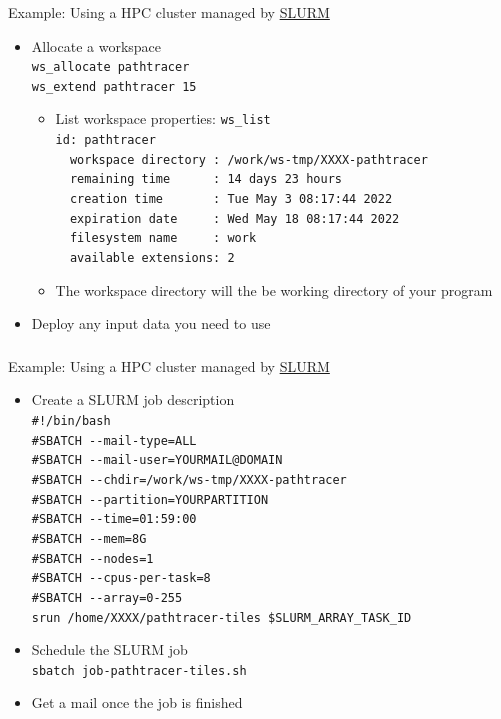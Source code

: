\documentclass[utf8,stillsansserifmath,fleqn,t]{beamer}
\newcommand{\code}[1]{\texttt{#1}}
\begin{document}
\begin{frame}
\frametitle{\insertsection}
Example: Using a HPC cluster managed by
\href{https://slurm.schedmd.com/}{SLURM}
\begin{itemize}
\item Allocate a workspace\\
    \code{ws\_allocate pathtracer}\\
    \code{ws\_extend pathtracer 15}\\
    \begin{itemize}
    \item List workspace properties: \code{ws\_list}\\
    \code{id: pathtracer}\\
    \code{~~workspace directory~: /work/ws-tmp/XXXX-pathtracer}\\
    \code{~~remaining time~~~~~~: 14 days 23 hours}\\
    \code{~~creation time~~~~~~~: Tue May  3 08:17:44 2022}\\
    \code{~~expiration date~~~~~: Wed May 18 08:17:44 2022}\\
    \code{~~filesystem name~~~~~: work}\\
    \code{~~available extensions: 2}
    \item The workspace directory will the be working directory
    of your program
    \end{itemize}
\item Deploy any input data you need to use
\end{itemize}
\end{frame}

\begin{frame}
\frametitle{\insertsection}
Example: Using a HPC cluster managed by
\href{https://slurm.schedmd.com/}{SLURM}
\begin{itemize}
\item Create a SLURM job description\\
    \code{\#!/bin/bash}\\
    \code{\#SBATCH -{}-mail-type=ALL}\\
    \code{\#SBATCH -{}-mail-user=YOURMAIL@DOMAIN}\\
    \code{\#SBATCH -{}-chdir=/work/ws-tmp/XXXX-pathtracer}\\
    \code{\#SBATCH -{}-partition=YOURPARTITION}\\
    \code{\#SBATCH -{}-time=01:59:00}\\
    \code{\#SBATCH -{}-mem=8G}\\
    \code{\#SBATCH -{}-nodes=1}\\
    \code{\#SBATCH -{}-cpus-per-task=8}\\
    \code{\#SBATCH -{}-array=0-255}\\
    \code{srun /home/XXXX/pathtracer-tiles \$SLURM\_ARRAY\_TASK\_ID}
\item Schedule the SLURM job\\
    \code{sbatch job-pathtracer-tiles.sh}
\item Get a mail once the job is finished
\end{itemize}
\end{frame}
\end{document}
